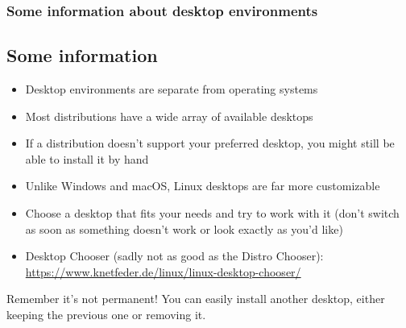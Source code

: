 \begin{frame}
	\frametitle{Some information about desktop environments}
	\subsection{Some information}
	
	\begin{itemize}
		\item Desktop environments are separate from operating systems
		\item Most distributions have a wide array of available desktops
		\item If a distribution doesn't support your preferred desktop, you might still be able to install it by hand
		\item Unlike Windows and macOS, Linux desktops are far more customizable
		\item Choose a desktop that fits your needs and try to work with it (don't switch as soon as something doesn't work or look exactly as you'd like)
		\item Desktop Chooser\cite{desktopchooser} (sadly not as good as the Distro Chooser): \url{https://www.knetfeder.de/linux/linux-desktop-chooser/}
	\end{itemize}

	\hfill

	\begin{alertblock}{Remember it's not permanent!}
		You can easily install another desktop, either keeping the previous one or removing it.
	\end{alertblock}
\end{frame}
